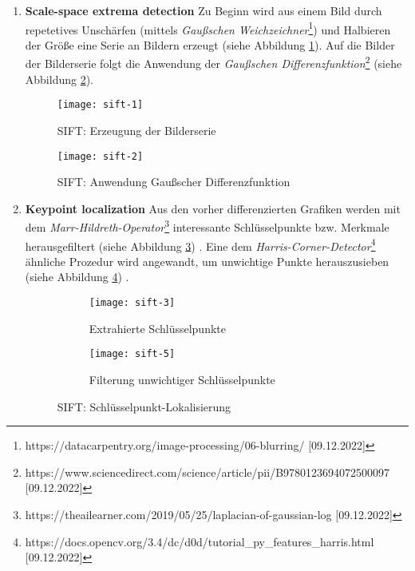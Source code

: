 \begin{enumerate}
    \item \textbf{Scale-space extrema detection}\newline
    Zu Beginn wird aus einem Bild durch repetetives Unschärfen (mittels
    \textit{Gaußschen Weichzeichner}\footnote{https://datacarpentry.org/image-processing/06-blurring/ [09.12.2022]})
    und Halbieren der Größe eine Serie an Bildern erzeugt (siehe Abbildung
    \ref{fig:sift1}). Auf die Bilder der Bilderserie folgt die Anwendung der
    \textit{Gaußschen Differenzfunktion}\footnote{https://www.sciencedirect.com/science/article/pii/B9780123694072500097 [09.12.2022]}
    (siehe Abbildung \ref{fig:sift2}). \parencite{sift-web-scale-space}

    \begin{figure}[H]
        \centering
        \texttt{[image: sift-1]}
        \caption{SIFT: Erzeugung der Bilderserie}
        \label{fig:sift1}
    \end{figure}

    \begin{figure}[H]
        \centering
        \texttt{[image: sift-2]}
        \caption{SIFT: Anwendung Gaußscher Differenzfunktion}
        \label{fig:sift2}
    \end{figure}

    \item \textbf{Keypoint localization}\newline
    Aus den vorher differenzierten Grafiken werden mit dem
    \textit{Marr-Hildreth-Operator}\footnote{https://theailearner.com/2019/05/25/laplacian-of-gaussian-log [09.12.2022]}
    interessante Schlüsselpunkte bzw. Merkmale herausgefiltert (siehe Abbildung
    \ref{fig:sift3}) \parencite{sift-web-keypoint}. Eine dem \textit{Harris-Corner-Detector}\footnote{https://docs.opencv.org/3.4/dc/d0d/tutorial\_py\_features\_harris.html [09.12.2022]}
    ähnliche Prozedur wird angewandt, um unwichtige Punkte herauszusieben
    (siehe Abbildung \ref{fig:sift5}) \parencite{sift-web-low-contrast}.

    \begin{figure}[H]
        \centering
        \begin{subfigure}{.5\textwidth}
          \centering
          \texttt{[image: sift-3]}
          \caption{Extrahierte Schlüsselpunkte}
          \label{fig:sift3}
        \end{subfigure}%
        \begin{subfigure}{.5\textwidth}
          \centering
          \texttt{[image: sift-5]}
          \caption{Filterung unwichtiger Schlüsselpunkte}
          \label{fig:sift5}
        \end{subfigure}
        \caption{SIFT: Schlüsselpunkt-Lokalisierung}
        \label{fig:sift-keypoint}
    \end{figure}


\end{enumerate}

